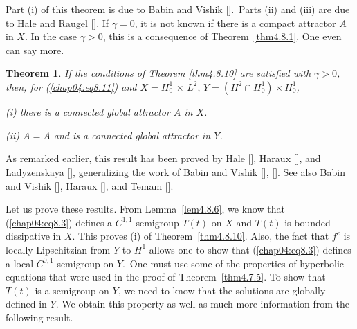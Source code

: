 \documentclass{surv-l}
\theoremstyle{plain}
\newtheorem{theorem}{Theorem}[section]
\theoremstyle{definition}
\numberwithin{equation}{section}
\numberwithin{figure}{chapter}
\begin{document}
Part (i) of this theorem is due to Babin and Vishik [\citeyear{1983bv}].\, Parts (ii) and (iii) are due to Hale and Raugel [\citeyear{1988hra}]. If $\gamma=0$, it is not known if there is a compact attractor $A$ in $X$. In the case $\gamma>0$, this is a consequence of Theorem~\ref{thm4.8.1}. One even can say more.

\begin{theorem}\label{thm4.8.11} If the conditions of Theorem \emph{\ref{thm4.8.10}} are satisfied with $\gamma>0$, then, for \emph{(\ref{chap04:eq8.11})} and $X=H_{0}^{1}\, \times\, L^{2},\, Y=(H^{2}\cap H_{0}^{1})\times H_{0}^{1}$,

\emph{(i)} there is a connected global attractor $A$ in $X$.

\emph{(ii)} $A=\tilde{A}$ and is a connected global attractor in $Y$.
\end{theorem}

As remarked earlier, this result has been proved by Hale [\citeyear{1985h}], Haraux [\citeyear{1985haraux}], and Ladyzenskaya [\citeyear{1987l}], generalizing the work of Babin and Vishik [\citeyear{1983bv}], [\citeyear{1985bv}]. See also Babin and Vishik [\citeyear{1986bv}], Haraux [\citeyear{1988h}], and Temam [\citeyear{1988t}].

Let us prove these results. From Lemma~\ref{lem4.8.6}, we know that (\ref{chap04:eq8.3}) defines a $C^{1,1}$-semigroup $T(t)$ on $X$ and $T(t)$ is bounded dissipative in $X$. This proves (i) of Theorem~\ref{thm4.8.10}. Also, the fact that $f^{e}$ is locally Lipschitzian from $Y$ to $H^{1}$ allows one to show that (\ref{chap04:eq8.3}) defines a local $C^{0,1}$-semigroup on $Y$.\, One must use some of the properties of hyperbolic equations that were used in the proof of Theorem~\ref{thm4.7.5}. To show that $T(t)$ is a semigroup on $Y$, we need to know that the solutions are globally defined in $Y$. We obtain this property as well as much more information from the following result.
\end{document}

